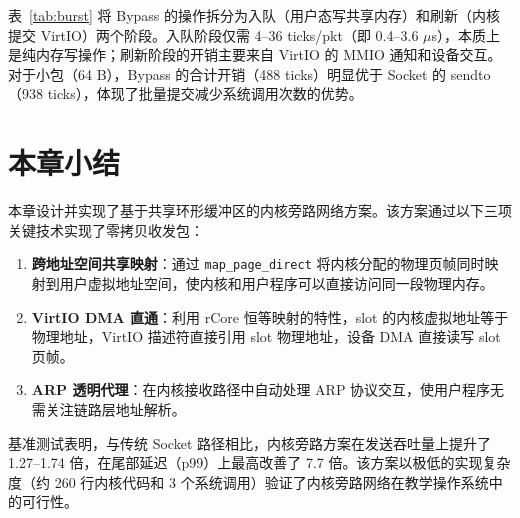 表~\ref{tab:burst} 将 Bypass 的操作拆分为入队（用户态写共享内存）和刷新（内核提交 VirtIO）两个阶段。入队阶段仅需 4--36 ticks/pkt（即 0.4--3.6 $\mu$s），本质上是纯内存写操作；刷新阶段的开销主要来自 VirtIO 的 MMIO 通知和设备交互。对于小包（64 B），Bypass 的合计开销（488 ticks）明显优于 Socket 的 sendto（938 ticks），体现了批量提交减少系统调用次数的优势。

\section{本章小结}

本章设计并实现了基于共享环形缓冲区的内核旁路网络方案。该方案通过以下三项关键技术实现了零拷贝收发包：

\begin{enumerate}
    \item \textbf{跨地址空间共享映射}：通过 \texttt{map\_page\_direct} 将内核分配的物理页帧同时映射到用户虚拟地址空间，使内核和用户程序可以直接访问同一段物理内存。
    \item \textbf{VirtIO DMA 直通}：利用 rCore 恒等映射的特性，slot 的内核虚拟地址等于物理地址，VirtIO 描述符直接引用 slot 物理地址，设备 DMA 直接读写 slot 页帧。
    \item \textbf{ARP 透明代理}：在内核接收路径中自动处理 ARP 协议交互，使用户程序无需关注链路层地址解析。
\end{enumerate}

基准测试表明，与传统 Socket 路径相比，内核旁路方案在发送吞吐量上提升了 1.27--1.74 倍，在尾部延迟（p99）上最高改善了 7.7 倍。该方案以极低的实现复杂度（约 260 行内核代码和 3 个系统调用）验证了内核旁路网络在教学操作系统中的可行性。
